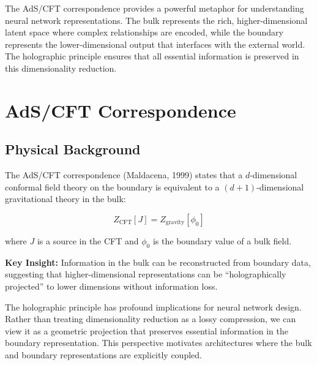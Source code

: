 \documentclass[12pt,a4paper]{article}
\begin{document}
The AdS/CFT correspondence provides a powerful metaphor for understanding neural network representations. The bulk represents the rich, higher-dimensional latent space where complex relationships are encoded, while the boundary represents the lower-dimensional output that interfaces with the external world. The holographic principle ensures that all essential information is preserved in this dimensionality reduction.

\section{AdS/CFT Correspondence}

\subsection{Physical Background}

The AdS/CFT correspondence (Maldacena, 1999) states that a $d$-dimensional conformal field theory on the boundary is equivalent to a $(d+1)$-dimensional gravitational theory in the bulk:

\begin{equation}
Z_{\text{CFT}}[J] = Z_{\text{gravity}}[\phi_0]
\end{equation}

where $J$ is a source in the CFT and $\phi_0$ is the boundary value of a bulk field.

\textbf{Key Insight:} Information in the bulk can be reconstructed from boundary data, suggesting that higher-dimensional representations can be ``holographically projected'' to lower dimensions without information loss.

The holographic principle has profound implications for neural network design. Rather than treating dimensionality reduction as a lossy compression, we can view it as a geometric projection that preserves essential information in the boundary representation. This perspective motivates architectures where the bulk and boundary representations are explicitly coupled.
\end{document}

